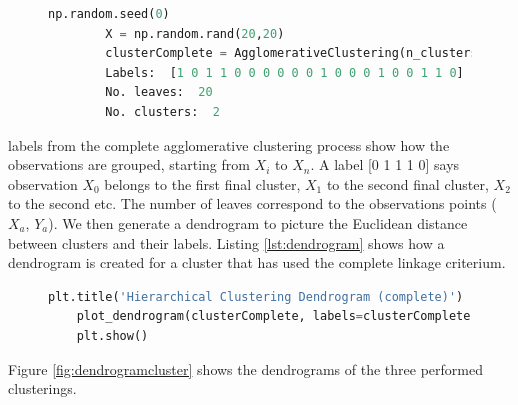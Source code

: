 \begin{figure}[H]
	\begin{lstlisting}[caption=Hierarchical clustering, label={lst:acpython}, language=Python]
		np.random.seed(0)
		X = np.random.rand(20,20)
		clusterComplete = AgglomerativeClustering(n_clusters=2, affinity='euclidean', compute_full_tree='auto', linkage='complete').fit(X)
		Labels:  [1 0 1 1 0 0 0 0 0 0 1 0 0 0 1 0 0 1 1 0]
		No. leaves:  20
		No. clusters:  2
	\end{lstlisting}
\end{figure}

\noindent labels from the complete agglomerative clustering process show how the observations are grouped, starting from $X_i$ to $X_n$. A label [0 1 1 1 0] says observation $X_0$ belongs to the first final cluster, $X_1$ to the second final cluster, $X_2$ to the second etc. The number of leaves correspond to the observations points ($X_a$, $Y_a$). We then generate a dendrogram to picture the Euclidean distance between clusters and their labels. Listing \ref{lst:dendrogram} shows how a dendrogram is created for a cluster that has used the complete linkage criterium.

\begin{figure}[H]
	\begin{lstlisting}[caption=Creating dendrograms for a complete cluster, label={lst:dendrogram}, language=Python]
	plt.title('Hierarchical Clustering Dendrogram (complete)')
	plot_dendrogram(clusterComplete, labels=clusterComplete.labels_)
	plt.show()
	\end{lstlisting}
\end{figure}

Figure \ref{fig:dendrogramcluster} shows the dendrograms of the three performed clusterings.

